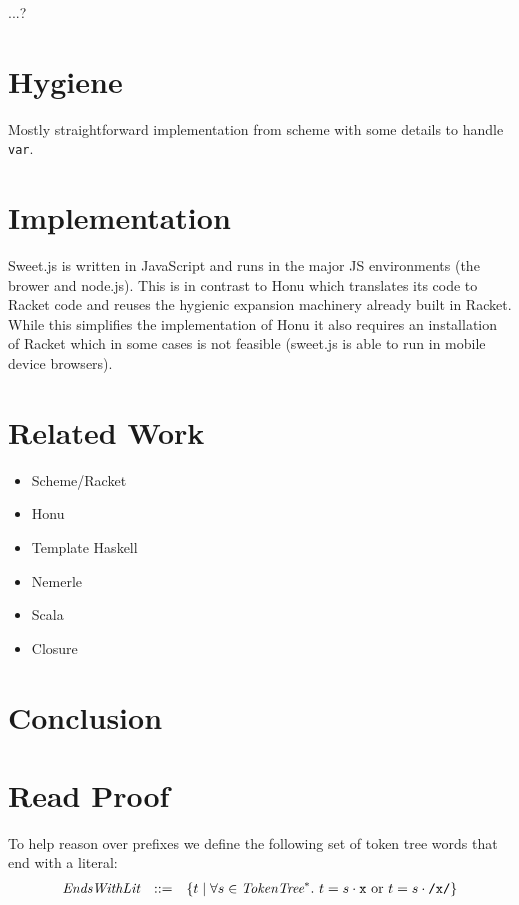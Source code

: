 \documentclass[preprint,10pt]{sigplanconf}
\begin{document}
...?

\section{Hygiene}
\label{sec-5}

Mostly straightforward implementation from scheme with some details to
handle \texttt{var}.
\section{Implementation}
\label{sec-6}
Sweet.js is written in JavaScript and runs in the major JS
environments (\ie the brower and node.js). This is in contrast to Honu
which translates its code to Racket code and reuses the hygienic
expansion machinery already built in Racket. While this simplifies
the implementation of Honu it also requires an installation of Racket
which in some cases is not feasible (\eg sweet.js is able to run in
mobile device browsers).
\section{Related Work}
\label{sec-7}

\begin{itemize}
\item Scheme/Racket
\item Honu
\item Template Haskell
\item Nemerle
\item Scala
\item Closure
\end{itemize}
\section{Conclusion}
\label{sec-8}

\appendix

\section{Read Proof}

To help reason over prefixes we define the following set of token tree
words that end with a literal:
\[
\begin{array}{rcl}
\textit{EndsWithLit} &::=& \{t \mid \forall s \in \textit{TokenTree}^{*}.~t = s \cdot \texttt{x}
~\textrm{or}~ t = s \cdot \texttt{/x/} \}
\end{array}
\]
\end{document}
